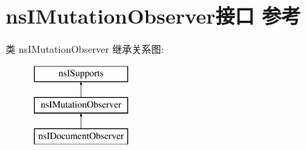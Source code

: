 \hypertarget{interfacens_i_mutation_observer}{}\section{ns\+I\+Mutation\+Observer接口 参考}
\label{interfacens_i_mutation_observer}
类 ns\+I\+Mutation\+Observer 继承关系图\+:\begin{figure}[H]
\begin{center}
\leavevmode
\includegraphics[height=3.000000cm]{interfacens_i_mutation_observer}
\end{center}
\end{figure}

